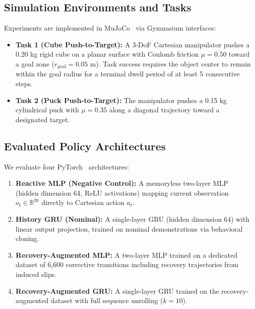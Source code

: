 \documentclass[letterpaper, 10 pt, conference]{ieeeconf}
\begin{document}
\subsection{Simulation Environments and Tasks}
Experiments are implemented in MuJoCo~\cite{towers2024gymnasium} via Gymnasium interfaces:
\begin{itemize}
    \item \textbf{Task 1 (Cube Push-to-Target):} A 3-DoF Cartesian manipulator pushes a 0.20 kg rigid cube on a planar surface with Coulomb friction $\mu = 0.50$ toward a goal zone ($r_{\text{goal}} = 0.05\text{ m}$). Task success requires the object center to remain within the goal radius for a terminal dwell period of at least 5 consecutive steps.
    \item \textbf{Task 2 (Puck Push-to-Target):} The manipulator pushes a 0.15 kg cylindrical puck with $\mu = 0.35$ along a diagonal trajectory toward a designated target.
\end{itemize}

\subsection{Evaluated Policy Architectures}
We evaluate four PyTorch~\cite{paszke2019pytorch} architectures:
\begin{enumerate}
    \item \textbf{Reactive MLP (Negative Control):} A memoryless two-layer MLP (hidden dimension 64, ReLU activations) mapping current observation $o_t \in \mathbb{R}^{20}$ directly to Cartesian action $a_t$.
    \item \textbf{History GRU (Nominal):} A single-layer GRU (hidden dimension 64) with linear output projection, trained on nominal demonstrations via behavioral cloning.
    \item \textbf{Recovery-Augmented MLP:} A two-layer MLP trained on a dedicated dataset of 6,600 corrective transitions including recovery trajectories from induced slips.
    \item \textbf{Recovery-Augmented GRU:} A single-layer GRU trained on the recovery-augmented dataset with full sequence unrolling ($k=10$).
\end{enumerate}
\end{document}
